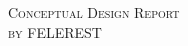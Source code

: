 \begin{titlepage}
	\centering 
    \vspace*{5 cm}
	\textsc{\Large Conceptual Design Report}\\[0.5 cm]
	
	\textsc{\Large by FELEREST}\\[0.2 cm]
	
\end{titlepage}